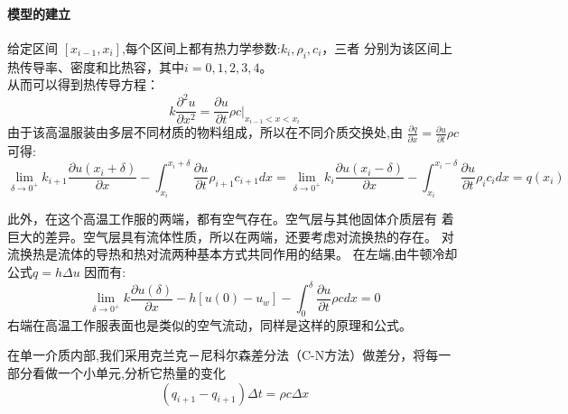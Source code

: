 \documentclass{cumcmthesis}
\begin{document}
        \paragraph{模型的建立}
        给定区间 \([x_{i-1},x_i]\),每个区间上都有热力学参数:\(k_i,\rho_i,c_i\)，三者
    分别为该区间上热传导率、密度和比热容，其中\(i=0,1,2,3,4\)。\\
    从而可以得到热传导方程：\cite{2}
    \[k\frac{\partial^2 u}{\partial x^2} = \frac{\partial u}{\partial t}\rho c |_{x_{i-1}<x<x_{i}}\] 
    由于该高温服装由多层不同材质的物料组成，所以在不同介质交换处,由
    \(\frac{\partial{q}}{\partial{x}} = \frac{\partial{u}}{\partial{t}} \rho c \)
    可得:
    \[ 
        \lim_{\delta \to 0^+} 
        k_{i+1 }\frac{\partial{u(x_i+\delta)}}{\partial{x}} 
        -
        \int_{x_i}^{x_i+\delta}\frac{\partial{u}}{\partial{t}} \rho_{i+1} c_{i+1} dx 
        = 
        \lim_{\delta \to 0^+} 
        k_{i} \frac{\partial{u(x_i-\delta)}}{\partial{x}}
        - 
        \int_{x_i}^{x_i-\delta}\frac{\partial{u}}{\partial{t}} \rho_i c_i dx
        =
        q(x_i)
    \]

    此外，在这个高温工作服的两端，都有空气存在。空气层与其他固体介质层有
    着巨大的差异。空气层具有流体性质，所以在两端，还要考虑对流换热的存在。
    对流换热是流体的导热和热对流两种基本方式共同作用的结果。
    在左端,由牛顿冷却公式\(q = h\Delta u\)
    因而有:
    \[
        \lim_{\delta \to 0^+} 
        k\frac{\partial{u(\delta)}}{\partial{x}} 
        - 
        h[u(0) - u_w]
        -
        \int_{0}^{\delta}\frac{\partial{u}}{\partial{t}} \rho c dx 
        = 0
    \]
    右端在高温工作服表面也是类似的空气流动，同样是这样的原理和公式。

    在单一介质内部,我们采用克兰克－尼科尔森差分法（C-N方法）做差分，将每一部分看做一个小单元,分析它热量的变化
    \[(q_{i+1} - q_{i+1})\Delta t = \rho c \Delta x\]
\end{document}

